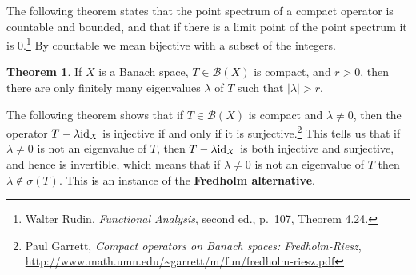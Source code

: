 \documentclass{article}
\newcommand{\id}{\ensuremath\mathrm{id}}
\theoremstyle{definition}
\newtheorem{theorem}{Theorem}
\begin{document}
The following theorem states  that the point spectrum of a compact operator is countable and bounded, and that if there is a limit point of the point spectrum
it is $0$.\footnote{Walter Rudin, {\em Functional Analysis}, second ed., p.~107, Theorem 4.24.} By countable we mean bijective with a subset
of the integers.

\begin{theorem}
If $X$ is a Banach space, $T \in \mathscr{B}(X)$ is compact, and $r>0$, then there are only finitely many eigenvalues $\lambda$ of $T$ such that $|\lambda| > r$.
\end{theorem}



The following theorem shows that if $T \in \mathscr{B}(X)$ is compact and $\lambda \neq 0$, then the operator
$T-\lambda \id_X$ is injective if and only if it is surjective.\footnote{Paul Garrett, {\em Compact operators on Banach spaces: Fredholm-Riesz}, \url{http://www.math.umn.edu/~garrett/m/fun/fredholm-riesz.pdf}} This tells us that if $\lambda \neq 0$ is not an eigenvalue of $T$, then $T - \lambda \id_X$ is both injective and surjective, and hence is invertible, which means that if $\lambda \neq 0$ is not an eigenvalue of $T$ then $\lambda \not \in \sigma(T)$.
This is an instance of the \textbf{Fredholm alternative}.
\end{document}
